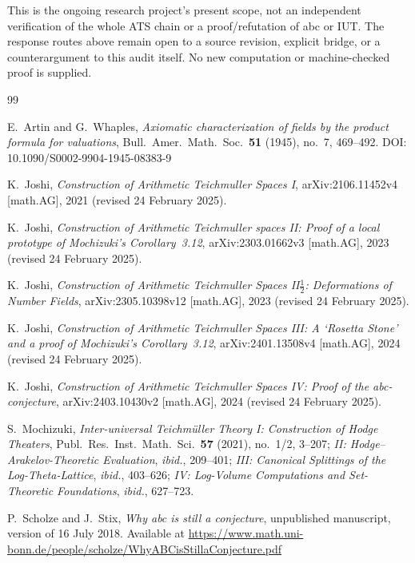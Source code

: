 \documentclass[11pt,a4paper]{article}
\theoremstyle{definition}
\theoremstyle{remark}
\begin{document}
This is the ongoing research project's present scope, not an independent
verification of the whole ATS chain or a proof/refutation of abc or IUT.
The response routes above remain open to a source revision, explicit
bridge, or a counterargument to this audit itself. No new computation or
machine-checked proof is supplied.



\begin{thebibliography}{99}
\raggedright

E.~Artin and G.~Whaples,
\emph{Axiomatic characterization of fields by the product formula for
valuations},
Bull.\ Amer.\ Math.\ Soc.\ \textbf{51} (1945), no.~7, 469--492.
DOI: 10.1090/S0002-9904-1945-08383-9

K.~Joshi,
\emph{Construction of Arithmetic Teichmuller Spaces I},
arXiv:2106.11452v4 [math.AG], 2021 (revised 24 February 2025).

K.~Joshi,
\emph{Construction of Arithmetic Teichmuller spaces II: Proof of a local
prototype of Mochizuki's Corollary~3.12},
arXiv:2303.01662v3 [math.AG], 2023 (revised 24 February 2025).

K.~Joshi,
\emph{Construction of Arithmetic Teichmuller Spaces II$\frac{1}{2}$:
Deformations of Number Fields},
arXiv:2305.10398v12 [math.AG], 2023 (revised 24 February 2025).

K.~Joshi,
\emph{Construction of Arithmetic Teichmuller Spaces III: A `Rosetta Stone'
and a proof of Mochizuki's Corollary~3.12},
arXiv:2401.13508v4 [math.AG], 2024 (revised 24 February 2025).

K.~Joshi,
\emph{Construction of Arithmetic Teichmuller Spaces IV: Proof of the
abc-conjecture},
arXiv:2403.10430v2 [math.AG], 2024 (revised 24 February 2025).

S.~Mochizuki,
\emph{Inter-universal Teichm\"{u}ller Theory I: Construction of Hodge
Theaters}, Publ.\ Res.\ Inst.\ Math.\ Sci.\ \textbf{57} (2021), no.~1/2,
3--207;
\emph{II: Hodge--Arakelov-Theoretic Evaluation}, \emph{ibid.}, 209--401;
\emph{III: Canonical Splittings of the Log-Theta-Lattice}, \emph{ibid.}, 403--626;
\emph{IV: Log-Volume Computations and Set-Theoretic Foundations},
\emph{ibid.}, 627--723.

P.~Scholze and J.~Stix,
\emph{Why abc is still a conjecture},
unpublished manuscript, version of 16 July 2018.
Available at
\url{https://www.math.uni-bonn.de/people/scholze/WhyABCisStillaConjecture.pdf}


\end{thebibliography}
\end{document}
